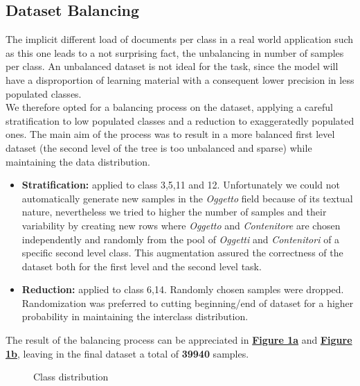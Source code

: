 \documentclass[12pt]{article}
\begin{document}
\subsection{Dataset Balancing} \label{sec:dataset-balancing}
The implicit different load of documents per class in a real world application such as this one leads to a not surprising fact, the unbalancing in number of samples per class. An unbalanced dataset is not ideal for the task, since the model will have a disproportion of learning material with a consequent lower precision in less populated classes. \\We therefore opted for a balancing process on the dataset, applying a careful stratification to low populated classes and a reduction to exaggeratedly populated ones. The main aim of the process was to result in a more balanced first level dataset (the second level of the tree is too unbalanced and sparse) while maintaining the data distribution. 
\begin{itemize}
    \item \textbf{Stratification:} applied to class 3,5,11 and 12. Unfortunately we could not automatically generate new samples in the \textit{Oggetto} field because of its textual nature, nevertheless we tried to higher the number of samples and their variability by creating new rows where \textit{Oggetto} and \textit{Contenitore} are chosen independently and randomly from the pool of \textit{Oggetti} and \textit{Contenitori} of a specific second level class. This augmentation assured the correctness of the dataset both for the first level and the second level task. 
    \item \textbf{Reduction:} applied to class 6,14. Randomly chosen samples were dropped. Randomization was preferred to cutting beginning/end of dataset for a higher probability in maintaining the interclass distribution.
\end{itemize}
The result of the balancing process can be appreciated in \hyperref[fig:before]{\textbf{Figure 1a}} and \hyperref[fig:after]{\textbf{Figure 1b}}, leaving in the final dataset a total of \textbf{39940} samples.
\begin{figure}[!tbp]
  \centering
  \hfill
\caption{Class distribution}
\end{figure}
\end{document}
